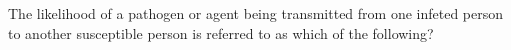 The likelihood of a pathogen or agent being transmitted from one infeted person to another susceptible person is referred to as which of the following?


